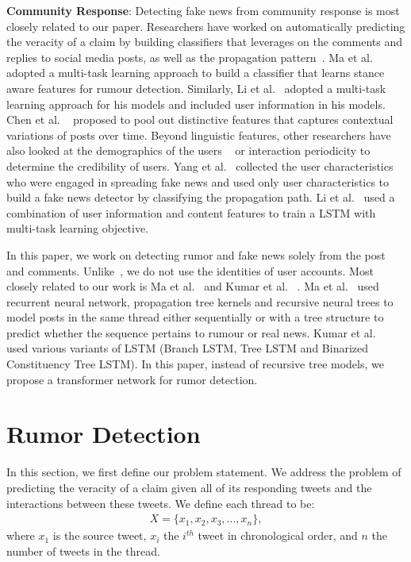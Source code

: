 \documentclass[letterpaper]{article} %
\begin{document}
\textbf{Community Response}:
Detecting fake news from community response is most closely related to our paper. Researchers have worked on automatically predicting the veracity of a claim by building classifiers that leverages on the comments and replies to social media posts, as well as the propagation pattern~\cite{omar17,castillo11,ma17,ma18}. Ma et al.~ adopted a multi-task learning approach to build a classifier that learns stance aware features for rumour detection. Similarly, Li et al.~ adopted a multi-task learning approach for his models and included user information in his models. Chen et al. ~ proposed to pool out distinctive features that captures contextual variations of posts over time. Beyond linguistic features, other researchers have also looked at the demographics of the users ~\cite{yang12,li-etal-2019-rumor} or interaction periodicity \cite{kwon13a} to determine the credibility of users. Yang et al.~ collected the user characteristics who were engaged in spreading fake news and used only user characteristics to build a fake news detector by classifying the propagation path. Li et al.~ used a combination of user information and content features to train a LSTM with multi-task learning objective.

In this paper, we work on detecting rumor and fake news solely from the post and comments. Unlike~\citet{li-etal-2019-rumor,yang12}, we do not use the identities of user accounts. Most closely related to our work is Ma et al.~ and Kumar et al. ~. Ma et al.~ used recurrent neural network, propagation tree kernels and recursive neural trees to model posts in the same thread either sequentially or with a tree structure to predict whether the sequence pertains to rumour or real news. Kumar et al.~ used various variants of LSTM (Branch LSTM, Tree LSTM and Binarized
Constituency Tree LSTM). In this paper, instead of recursive tree models, we propose a transformer network for rumor detection.

\section{Rumor Detection} \label{motivation_and_analysis}

In this section, we first define our problem statement. We address the problem of predicting the veracity of a claim given all of its responding tweets and the interactions between these tweets. We define each thread to be:
\begin{eqnarray*}
X = \{x_1, x_{2}, x_{3}, ... , x_{n}\},
\end{eqnarray*}
where $x_1$ is the source tweet, $x_{i}$ the $i^{th}$ tweet in chronological order, and $n$ the number of tweets in the thread.
\end{document}
